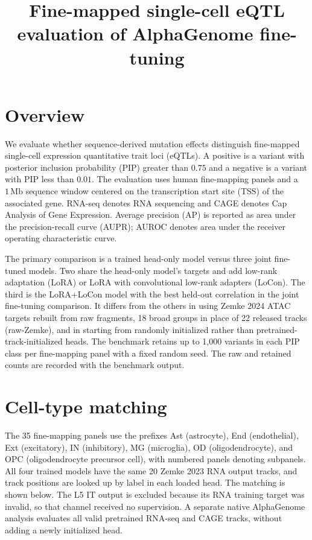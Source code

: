 \documentclass[11pt]{article}
\title{Fine-mapped single-cell eQTL evaluation of AlphaGenome fine-tuning}
\author{}
\date{}
\begin{document}
\maketitle

\noindent{}

\section{Overview}
We evaluate whether sequence-derived mutation effects distinguish fine-mapped
single-cell expression quantitative trait loci (eQTLs). A positive is a
variant with posterior inclusion probability (PIP) greater than $0.75$ and a
negative is a variant with PIP less than $0.01$. The evaluation uses human
fine-mapping panels and a $1\,\mathrm{Mb}$ sequence window centered on the
transcription start site (TSS) of the associated gene. RNA-seq denotes RNA
sequencing and CAGE denotes Cap Analysis of Gene Expression. Average precision
(AP) is reported as area under the precision-recall curve (AUPR); AUROC denotes
area under the receiver operating characteristic curve.

The primary comparison is a trained head-only model versus three joint
fine-tuned models. Two share the head-only model's targets and add low-rank
adaptation (LoRA) or LoRA with convolutional low-rank adapters (LoCon). The
third is the LoRA+LoCon model with the best held-out correlation in the joint
fine-tuning comparison. It differs from the others in using Zemke 2024 ATAC
targets rebuilt from raw fragments, 18 broad groups in place of 22 released
tracks (raw-Zemke), and in starting from randomly initialized rather than
pretrained-track-initialized heads. The benchmark retains
up to 1,000 variants in each PIP class per fine-mapping panel with a fixed
random seed. The raw and retained counts are recorded with the benchmark
output.

\section{Cell-type matching}
The 35 fine-mapping panels use the prefixes Ast (astrocyte), End (endothelial),
Ext (excitatory), IN (inhibitory), MG (microglia), OD (oligodendrocyte), and
OPC (oligodendrocyte precursor cell), with numbered panels denoting subpanels.
All four trained models have the same 20 Zemke 2023 RNA output tracks, and
track positions are looked up by label in each loaded head. The matching is
shown below. The L5 IT output is excluded because its RNA training target was
invalid, so that channel received no supervision. A separate native AlphaGenome analysis evaluates
all valid pretrained RNA-seq and CAGE tracks, without adding a newly initialized
head.
\end{document}
